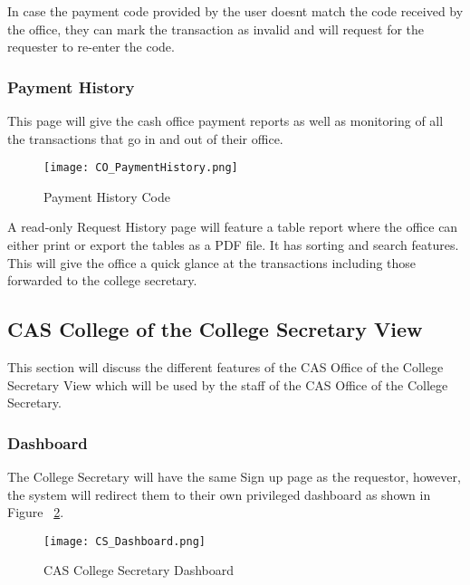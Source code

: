 In case the payment code provided by the user doesn\textsc{}t match the code received by the office, they can mark the transaction as invalid and will request for the requester to re-enter the code.

\subsubsection{Payment History}

This page will give the cash office payment reports as well as monitoring of all the transactions that go in and out of their office.

\begin{figure}[h]
    \centering 
    \begin{minipage}[c]{0.5\linewidth}
        \centering
        \texttt{[image: CO\_PaymentHistory.png]}
        \caption{Payment History Code}
        \label{fig:CO_PaymentHistory}
    \end{minipage}
\end{figure}

A read-only Request History page will feature a table report where the office can either print or export the tables as a PDF file. It has sorting and search features. This will give the office a quick glance at the transactions including those forwarded to the college secretary.


\subsection{CAS College of the College Secretary View}

This section will discuss the different features of the CAS Office of the College Secretary View which will be used by the staff of the CAS Office of the College Secretary.



\subsubsection{Dashboard}
The College Secretary will have the same Sign up page as the requestor, however, the system will redirect them to their own privileged dashboard as shown in Figure ~\ref{fig:CS_Dashboard}. 

    \begin{figure}[h]
        \centering 
        \begin{minipage}[c]{0.5\linewidth}
            \centering
            \texttt{[image: CS\_Dashboard.png]}
            \caption{CAS College Secretary Dashboard}
            \label{fig:CS_Dashboard}
        \end{minipage}
    \end{figure}

